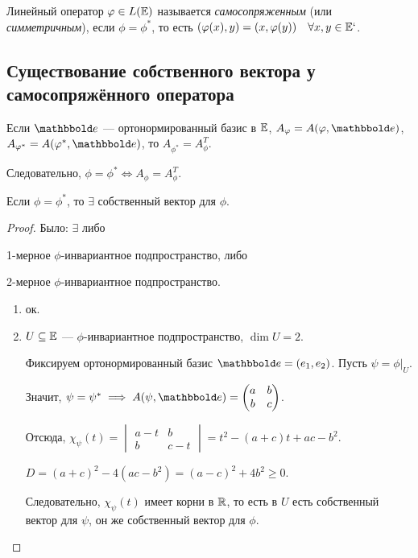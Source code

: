 \begin{definition}
    Линейный оператор $\varphi \in L(\mathbb{E})$ называется \textit{самосопряженным} (или \textit{симметричным}), если $\phi = \phi^{*}$, то есть $(\varphi(x), y) = (x, \varphi(y)) \quad \forall x, y \in \mathbb{E}`$.
\end{definition}


\subsection{Существование собственного вектора у самосопряжённого оператора}

Если $\E$ --- ортонормированный базис в $\mathbb{E}$, $A_\phi = A(\phi, \E)$, $A_{\phi^{*}} = A(\phi^{*}, \E)$, то $A_{\phi^{*}} = A_\phi^{T}$.

Следовательно, $\phi = \phi^{*} \iff A_\phi = A_\phi^{T}$.

\begin{proposal}
    Если $\phi = \phi^{*}$, то $\exists$ собственный вектор для $\phi$.
\end{proposal}

\begin{proof}
    Было: $\exists$ либо
    \begin{enumerate*}[label=\arabic*)]
    \item 1-мерное $\phi$-инвариантное подпространство, либо
    \item 2-мерное $\phi$-инвариантное подпространство.
    \end{enumerate*}

    \begin{enumerate}
    \item ок.
    \item $U \subseteq \mathbb{E}$ --- $\phi$-инвариантное подпространство, $\dim U = 2$.

        Фиксируем ортонормированный базис $\E = (e_1, e_2)$. Пусть $\psi = \phi \big|_{U}$.

        Значит, $\psi = \psi^{*} \implies A(\psi, \E) = \begin{pmatrix} a & b \\ b & c \end{pmatrix}$.

        Отсюда, $\chi_\psi(t) = \begin{vmatrix} a - t & b \\ b & c - t \end{vmatrix} = t^2 - (a + c)t + ac - b^2$.

        $D = (a + c)^2 - 4(ac - b^2) = (a - c)^2 + 4b^2 \geq 0$.

        Следовательно, $\chi_\psi(t)$ имеет корни в $\mathbb{R}$, то есть в $U$ есть собственный вектор для $\psi$, он же собственный вектор для $\phi$.
        \qedhere
    \end{enumerate}
\end{proof}


